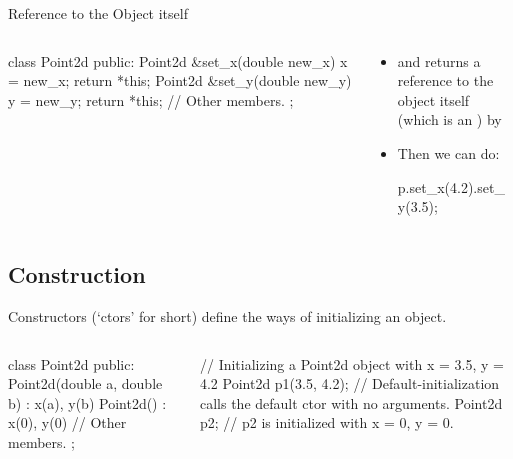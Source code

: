 \documentclass{beamer}
\begin{document}
\begin{frame}[fragile]{Reference to the Object itself}
    \begin{columns}
        \begin{column}{0.5\linewidth}
            \begin{cpp}
class Point2d {
 public:
  Point2d &set_x(double new_x) {
    x = new_x;
    return *this;
  }
  Point2d &set_y(double new_y) {
    y = new_y;
    return *this;
  }
  // Other members.
};
            \end{cpp}        
        \end{column}
        \begin{column}{0.5\linewidth}
            \begin{itemize}
                \item {} and  returns a reference to the object itself (which is an ) by 
                \item Then we can do:
                \begin{cpp}
p.set_x(4.2).set_y(3.5);
                \end{cpp}
            \end{itemize}
        \end{column}
    \end{columns}
\end{frame}

\subsection{Construction}

\begin{frame}[fragile]{Constructors}
     (`ctors' for short) define the ways of initializing an object.
    \begin{columns}
        \begin{column}{0.5\linewidth}
            \begin{cpp}
class Point2d {
 public:
  Point2d(double a, double b)
    : x(a), y(b) {}
  Point2d() : x(0), y(0) {}
  // Other members.
};
            \end{cpp}
        \end{column}
        \begin{column}{0.5\linewidth}
            \begin{cpp}
// Initializing a Point2d object with x = 3.5, y = 4.2
Point2d p1(3.5, 4.2);
// Default-initialization calls the default ctor with no arguments.
Point2d p2;
// p2 is initialized with x = 0, y = 0.
            \end{cpp}
        \end{column}
    \end{columns}
\end{frame}
\end{document}
